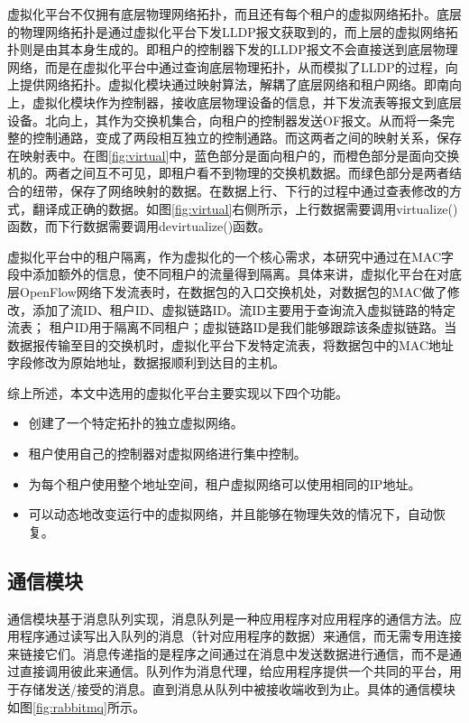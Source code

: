 虚拟化平台不仅拥有底层物理网络拓扑，而且还有每个租户的虚拟网络拓扑。底层的物理网络拓扑是通过虚拟化平台下发LLDP报文获取到的，而上层的虚拟网络拓扑则是由其本身生成的。即租户的控制器下发的LLDP报文不会直接送到底层物理网络，而是在虚拟化平台中通过查询底层物理拓扑，从而模拟了LLDP的过程，向上提供网络拓扑。虚拟化模块通过映射算法，解耦了底层网络和租户网络。即南向上，虚拟化模块作为控制器，接收底层物理设备的信息，并下发流表等报文到底层设备。北向上，其作为交换机集合，向租户的控制器发送OF报文。从而将一条完整的控制通路，变成了两段相互独立的控制通路。而这两者之间的映射关系，保存在映射表中。在图\ref{fig:virtual}中，蓝色部分是面向租户的，而橙色部分是面向交换机的。两者之间互不可见，即租户看不到物理的交换机数据。而绿色部分是两者结合的纽带，保存了网络映射的数据。在数据上行、下行的过程中通过查表修改的方式，翻译成正确的数据。如图\ref{fig:virtual}右侧所示，上行数据需要调用virtualize()函数，而下行数据需要调用devirtualize()函数。

虚拟化平台中的租户隔离，作为虚拟化的一个核心需求，本研究中通过在MAC字段中添加额外的信息，使不同租户的流量得到隔离。具体来讲，虚拟化平台在对底层OpenFlow网络下发流表时，在数据包的入口交换机处，对数据包的MAC做了修改，添加了流ID、租户ID、虚拟链路ID。流ID主要用于查询流入虚拟链路的特定流表； 租户ID用于隔离不同租户；虚拟链路ID是我们能够跟踪该条虚拟链路。当数据报传输至目的交换机时，虚拟化平台下发特定流表，将数据包中的MAC地址字段修改为原始地址，数据报顺利到达目的主机。

综上所述，本文中选用的虚拟化平台主要实现以下四个功能。
\begin{itemize}
\item 创建了一个特定拓扑的独立虚拟网络。
\item 租户使用自己的控制器对虚拟网络进行集中控制。
\item 为每个租户使用整个地址空间，租户虚拟网络可以使用相同的IP地址。
\item 可以动态地改变运行中的虚拟网络，并且能够在物理失效的情况下，自动恢复。
\end{itemize}


\subsection{通信模块}
通信模块基于消息队列实现，消息队列是一种应用程序对应用程序的通信方法。应用程序通过读写出入队列的消息（针对应用程序的数据）来通信，而无需专用连接来链接它们。消息传递指的是程序之间通过在消息中发送数据进行通信，而不是通过直接调用彼此来通信。队列作为消息代理，给应用程序提供一个共同的平台，用于存储发送/接受的消息。直到消息从队列中被接收端收到为止。具体的通信模块如图\ref{fig:rabbitmq}所示。

